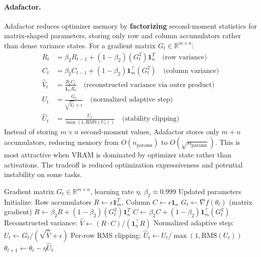 \paragraph{Adafactor.}
Adafactor reduces optimizer memory by \textbf{factorizing} second-moment statistics for matrix-shaped parameters, storing only row and column accumulators rather than dense variance states. For a gradient matrix $G_t \in \mathbb{R}^{m \times n}$:
\begin{align}
R_t &= \beta_2 R_{t-1} + (1-\beta_2)(G_t^2) \mathbf{1}_n^T \quad\text{(row variance)} \\
C_t &= \beta_2 C_{t-1} + (1-\beta_2) \mathbf{1}_m^\top (G_t^2) \quad\text{(column variance)} \\
\hat{V}_t &= \frac{R_t C_t}{\mathbf{1}_n^\top R_t} \quad\text{(reconstructed variance via outer product)} \\
U_t &= \frac{G_t}{\sqrt{\hat{V}_t}+\epsilon} \quad\text{(normalized adaptive step)} \\
\hat{U}_t &= \frac{U_t}{\max(1, \text{RMS}(U_t))} \quad\text{(stability clipping)}
\end{align}
Instead of storing $m \times n$ second-moment values, Adafactor stores only $m + n$ accumulators, reducing memory from $O(n_{\text{params}})$ to $O(\sqrt{n_{\text{params}}})$. This is most attractive when VRAM is dominated by optimizer state rather than activations. The tradeoff is reduced optimization expressiveness and potential instability on some tasks.

\begin{algorithm}[H]
\caption{Adafactor (Factorized Second-Moment Statistics)}
\label{alg:adafactor}
\begin{algorithmic}[1]
\Require Gradient matrix $G_t \in \mathbb{R}^{m \times n}$, learning rate $\eta$, $\beta_2 \approx 0.999$
\Ensure Updated parameters
\State Initialize: Row accumulators $R \gets \epsilon \mathbf{1}^T_m$, Column $C \gets \epsilon \mathbf{1}_n$
    \State $G_t \gets \nabla f(\theta_t)$ (matrix gradient)
    \State $R \gets \beta_2 R + (1-\beta_2) (G_t^2) \mathbf{1}_n^T$ 
    \State $C \gets \beta_2 C + (1-\beta_2) \mathbf{1}_m^\top (G_t^2)$ 
    \State Reconstructed variance: $\hat{V} \gets (R \cdot C) / (\mathbf{1}_n^\top R)$ 
    \State Normalized adaptive step: $U_t \gets G_t / (\sqrt{\hat{V}} + \epsilon)$
    \State Per-row RMS clipping: $\hat{U}_t \gets U_t / \max(1, \text{RMS}(U_t))$
    \State $\theta_{t+1} \gets \theta_t - \eta \hat{U}_t$
\EndFor
\end{algorithmic}
\end{algorithm}

